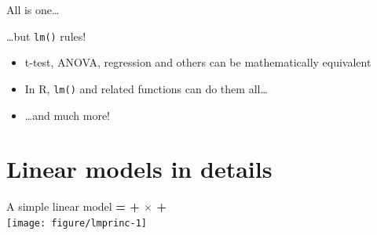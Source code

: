 \documentclass[10pt]{beamer}\usepackage[]{graphicx}\usepackage[]{color}
\newenvironment{knitrout}{}{} %
\begin{document}
\begin{frame}{All is one\dots}
\pause
  \begin{block}{\dots but \texttt{lm()} rules!}
    \begin{itemize}
      \item t-test, ANOVA, regression and others can be mathematically equivalent
      \item In R, \texttt{lm()} and related functions can do them all\dots
      \item \dots and much more!
    \end{itemize}
  \end{block}
\end{frame}

\section{Linear models in details}

\begin{frame}[fragile]{A simple linear model}
  \textbf{{\color{purple}{Response}} = {\color{blue}{Intercept}} + {\color{red}{Slope}} $\times$ {\color{orange}{Predictor}} + {\color{gray}{Error}}} \\
  
\begin{knitrout}
\color{fgcolor}
\texttt{[image: figure/lmprinc-1]} 

\end{knitrout}
\end{frame}
\end{document}
